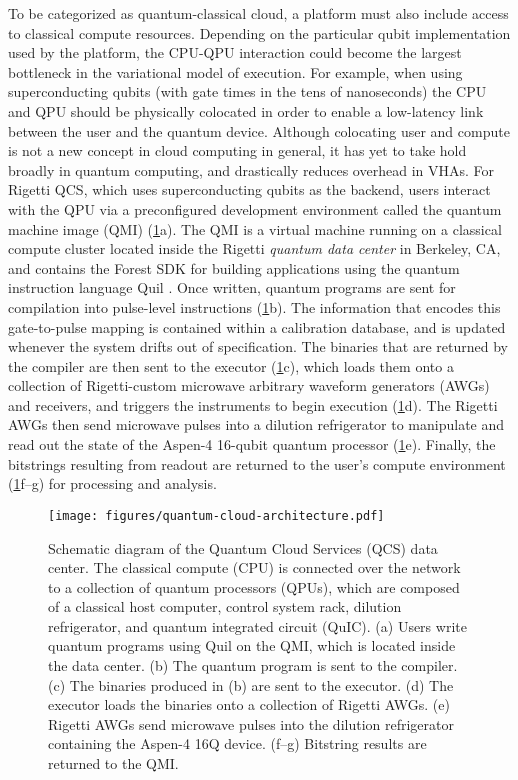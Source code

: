 \documentclass[12pt]{iopart}
\begin{document}
To be categorized as quantum-classical cloud, a platform must also include access to classical compute resources. Depending on the particular qubit implementation used by the platform, the CPU-QPU interaction could become the largest bottleneck in the variational model of execution. For example, when using superconducting qubits (with gate times in the tens of nanoseconds) the CPU and QPU should be physically colocated in order to enable a low-latency link between the user and the quantum device. Although colocating user and compute is not a new concept in cloud computing in general, it has yet to take hold broadly in quantum computing, and drastically reduces overhead in VHAs. For Rigetti QCS, which uses superconducting qubits as the backend, users interact with the QPU via a preconfigured development environment called the quantum machine image (QMI) (\cref{fig:QCS-Architecture}a). The QMI is a virtual machine running on a classical compute cluster located inside the Rigetti \textit{quantum data center} in Berkeley, CA, and contains the Forest SDK for building applications using the quantum instruction language Quil \cite{SmithQuil}. Once written, quantum programs are sent for compilation into pulse-level instructions (\cref{fig:QCS-Architecture}b). The information that encodes this gate-to-pulse mapping is contained within a calibration database, and is updated whenever the system drifts out of specification. The binaries that are returned by the compiler are then sent to the executor (\cref{fig:QCS-Architecture}c), which loads them onto a collection of Rigetti-custom microwave arbitrary waveform generators (AWGs) and receivers, and triggers the instruments to begin execution (\cref{fig:QCS-Architecture}d). The Rigetti AWGs then send microwave pulses into a dilution refrigerator to manipulate and read out the state of the Aspen-4 16-qubit quantum processor (\cref{fig:QCS-Architecture}e). Finally, the bitstrings resulting from readout are returned to the user's compute environment (\cref{fig:QCS-Architecture}f--g) for processing and analysis.

\begin{figure}
    \centering
    \texttt{[image: figures/quantum-cloud-architecture.pdf]}
    \caption{
    Schematic diagram of the Quantum Cloud Services (QCS) data center. The classical compute (CPU) is connected over the network to a collection of quantum processors (QPUs), which are composed of a classical host computer, control system rack, dilution refrigerator, and quantum integrated circuit (QuIC).
    (a) Users write quantum programs using Quil on the QMI, which is located inside the data center.
    (b) The quantum program is sent to the compiler. 
    (c) The binaries produced in (b) are sent to the executor.
    (d) The executor loads the binaries onto a collection of Rigetti AWGs.
    (e) Rigetti AWGs send microwave pulses into the dilution refrigerator containing the Aspen-4 16Q device. 
    (f--g) Bitstring results are returned to the QMI.
    }
    \label{fig:QCS-Architecture}
\end{figure}
\end{document}
